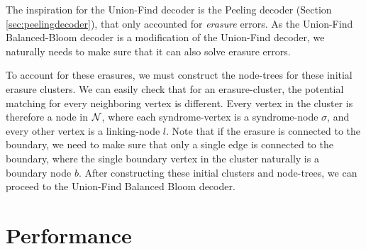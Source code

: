 The inspiration for the Union-Find decoder is the Peeling decoder (Section \ref{sec:peelingdecoder}), that only accounted for \emph{erasure} errors. As the Union-Find Balanced-Bloom decoder is a modification of the Union-Find decoder, we naturally needs to make sure that it can also solve erasure errors.

To account for these erasures, we must construct the node-trees for these initial erasure clusters. We can easily check that for an erasure-cluster, the potential matching for every neighboring vertex is different. Every vertex in the cluster is therefore a node in $\mathcal{N}$, where each syndrome-vertex is a syndrome-node $\sigma$, and every other vertex is a linking-node $l$. Note that if the erasure is connected to the boundary, we need to make sure that only a single edge is connected to the boundary, where the single boundary vertex in the cluster naturally is a boundary node $b$. After constructing these initial clusters and node-trees, we can proceed to the Union-Find Balanced Bloom decoder.  

\section{Performance}

